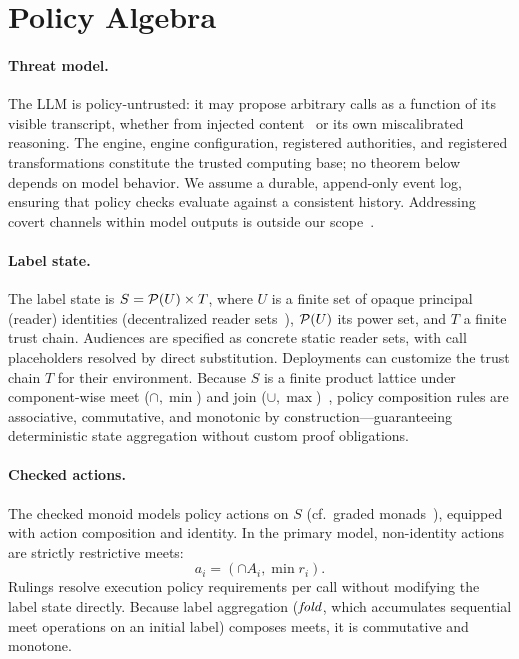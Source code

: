 \section{Policy Algebra}\label{sec:model}

\paragraph{Threat model.}
The LLM is policy-untrusted: it may propose arbitrary calls as a function of its visible transcript, whether from injected content~\cite{greshake2023not} or its own miscalibrated reasoning. The engine, engine configuration, registered authorities, and registered transformations constitute the trusted computing base; no theorem below depends on model behavior. We assume a durable, append-only event log, ensuring that policy checks evaluate against a consistent history. Addressing covert channels within model outputs is outside our scope~\cite{lampson1973note}.

\paragraph{Label state.}
The label state is $S = \mathcal{P}(U) \times T$, where $U$ is a finite set of opaque principal (reader) identities (decentralized reader sets~\cite{myers1997dlm}), $\mathcal{P}(U)$ its power set, and $T$ a finite trust chain. Audiences are specified as concrete static reader sets, with call placeholders resolved by direct substitution. Deployments can customize the trust chain $T$ for their environment. Because $S$ is a finite product lattice under component-wise meet ($\cap, \min$) and join ($\cup, \max$)~\cite{denning1976lattice,birkhoff1967lattice}, policy composition rules are associative, commutative, and monotonic by construction—guaranteeing deterministic state aggregation without custom proof obligations.

\paragraph{Checked actions.}
The checked monoid models policy actions on $S$ (cf.\ graded monads~\cite{katsumata2014graded}), equipped with action composition and identity. In the primary model, non-identity actions are strictly restrictive meets:
\[
  a_i = (\cap A_i, \min r_i).
\]
Rulings resolve execution policy requirements per call without modifying the label state directly. Because label aggregation ($\mathit{fold}$, which accumulates sequential meet operations on an initial label) composes meets, it is commutative and monotone.

